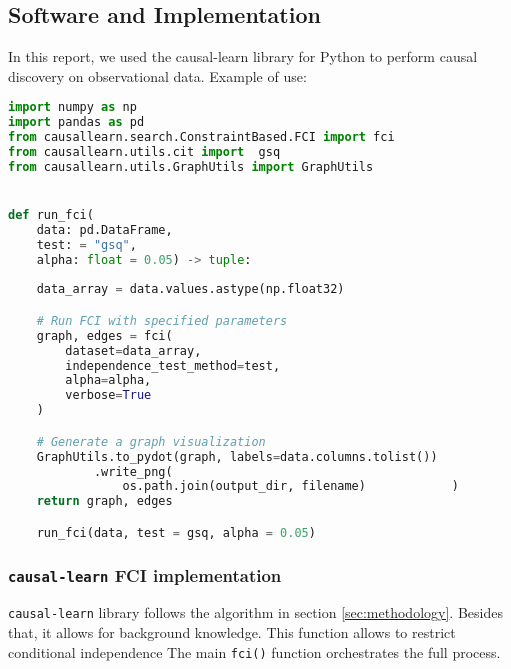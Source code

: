 \documentclass[main.tex]{subfiles}
\begin{document}
\subsection{Software and Implementation}
In this report, we used the causal-learn library for Python to perform causal discovery on observational data. Example of use:
\small \begin{lstlisting}[language=Python,]
import numpy as np
import pandas as pd
from causallearn.search.ConstraintBased.FCI import fci
from causallearn.utils.cit import  gsq
from causallearn.utils.GraphUtils import GraphUtils


def run_fci(
    data: pd.DataFrame,
    test: = "gsq",
    alpha: float = 0.05) -> tuple:
    
    data_array = data.values.astype(np.float32)

    # Run FCI with specified parameters
    graph, edges = fci(
        dataset=data_array,
        independence_test_method=test,
        alpha=alpha,
        verbose=True
    )

    # Generate a graph visualization
    GraphUtils.to_pydot(graph, labels=data.columns.tolist())
            .write_png(
                os.path.join(output_dir, filename)            )
    return graph, edges

    run_fci(data, test = gsq, alpha = 0.05)
\end{lstlisting}
\subsubsection{\texttt{causal-learn} FCI implementation}
 \texttt{causal-learn} library follows the algorithm in section \ref{sec:methodology}. Besides that, it allows for background knowledge. This function allows to restrict conditional independence  The main \texttt{fci()} function orchestrates the full process. 
\end{document}
